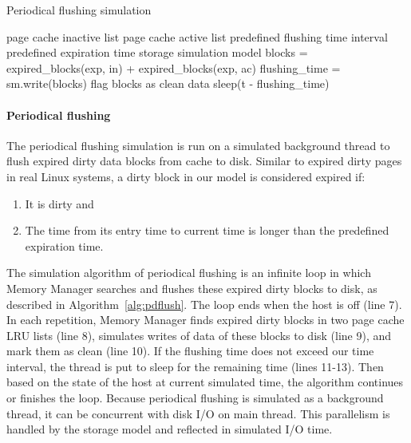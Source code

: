 \documentclass[conference]{IEEEtran}
\newcommand{\Desc}[2]{\State \makebox[2em][l]{#1}#2}
\begin{document}
            \begin{algorithm}\caption{Periodical flushing simulation}\label{alg:pdflush}
                \small
                \begin{algorithmic}[1]
                    \Input
                        \Desc{in}{page cache inactive list}
                        \Desc{ac}{page cache active list}
                        \Desc{t}{predefined flushing time interval}
                        \Desc{exp}{predefined expiration time}                        
                        \Desc{sm}{storage simulation model}
                       \EndInput
                        \State blocks = expired\_blocks(exp, in) + expired\_blocks(exp, ac) 
                        \State flushing\_time = sm.write(blocks)
                        \State flag blocks as clean data
                            \State sleep(t - flushing\_time)
                        \EndIf
                    \EndWhile
                \end{algorithmic}
            \end{algorithm}                

            \paragraph*{Periodical flushing}    
            The periodical flushing simulation is run on a simulated background thread 
            to flush expired dirty data blocks from cache to disk.
            Similar to expired dirty pages in real Linux systems, a dirty block in our model 
            is considered expired if: 
            \begin{enumerate}
                \item It is dirty and 
                \item The time from its entry time to current time is longer than the 
                predefined expiration time. 
            \end{enumerate}
            The simulation algorithm of periodical flushing is an infinite loop in which 
            Memory Manager searches and flushes these expired dirty blocks to disk, 
            as described in Algorithm~\ref{alg:pdflush}. 
            The loop ends when the host is off (line 7). 
            In each repetition, Memory Manager finds expired dirty blocks in two 
            page cache LRU lists (line 8), simulates writes of data of these blocks 
            to disk (line 9), and mark them as clean (line 10).
            If the flushing time does not exceed our time interval, the thread is put 
            to sleep for the remaining time (lines 11-13). 
            Then based on the state of the host at current simulated time, 
            the algorithm continues or finishes the loop.
            Because periodical flushing is simulated as a background thread, it can be 
            concurrent with disk I/O on main thread. This parallelism is handled by the 
            storage model and reflected in simulated I/O time.
\end{document}
